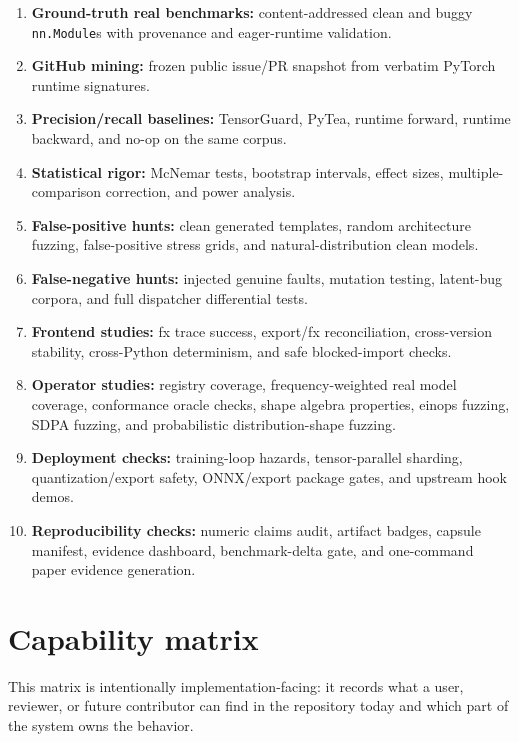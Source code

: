 \documentclass[11pt]{article}
\begin{document}
\begin{enumerate}[leftmargin=2em]
  \item \textbf{Ground-truth real benchmarks:} content-addressed clean and buggy
  \texttt{nn.Module}s with provenance and eager-runtime validation.
  \item \textbf{GitHub mining:} frozen public issue/PR snapshot from verbatim
  PyTorch runtime signatures.
  \item \textbf{Precision/recall baselines:} TensorGuard, PyTea, runtime
  forward, runtime backward, and no-op on the same corpus.
  \item \textbf{Statistical rigor:} McNemar tests, bootstrap intervals, effect
  sizes, multiple-comparison correction, and power analysis.
  \item \textbf{False-positive hunts:} clean generated templates, random
  architecture fuzzing, false-positive stress grids, and natural-distribution
  clean models.
  \item \textbf{False-negative hunts:} injected genuine faults, mutation
  testing, latent-bug corpora, and full dispatcher differential tests.
  \item \textbf{Frontend studies:} fx trace success, export/fx reconciliation,
  cross-version stability, cross-Python determinism, and safe blocked-import
  checks.
  \item \textbf{Operator studies:} registry coverage, frequency-weighted real
  model coverage, conformance oracle checks, shape algebra properties, einops
  fuzzing, SDPA fuzzing, and probabilistic distribution-shape fuzzing.
  \item \textbf{Deployment checks:} training-loop hazards, tensor-parallel
  sharding, quantization/export safety, ONNX/export package gates, and upstream
  hook demos.
  \item \textbf{Reproducibility checks:} numeric claims audit, artifact badges,
  capsule manifest, evidence dashboard, benchmark-delta gate, and one-command
  paper evidence generation.
\end{enumerate}

\section{Capability matrix}

This matrix is intentionally implementation-facing: it records what a user,
reviewer, or future contributor can find in the repository today and which part
of the system owns the behavior.
\end{document}
